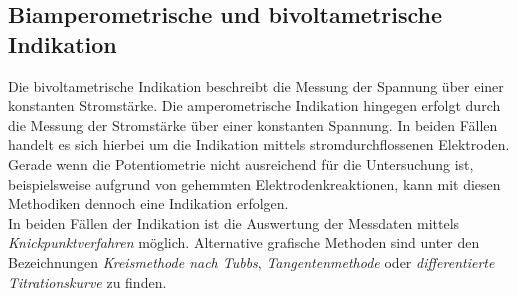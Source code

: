 \subsection*{Biamperometrische und bivoltametrische Indikation}
Die bivoltametrische Indikation beschreibt die Messung der Spannung über einer konstanten Stromstärke. Die amperometrische Indikation hingegen erfolgt durch die Messung der Stromstärke über einer konstanten Spannung. In beiden Fällen handelt es sich hierbei um die Indikation mittels stromdurchflossenen Elektroden. Gerade wenn die Potentiometrie nicht ausreichend für die Untersuchung ist, beispielsweise aufgrund von gehemmten Elektrodenkreaktionen, kann mit diesen Methodiken dennoch eine Indikation erfolgen.\\
In beiden Fällen der Indikation ist die Auswertung der Messdaten mittels \textit{Knickpunktverfahren} möglich. Alternative grafische Methoden sind unter den Bezeichnungen \textit{Kreismethode nach Tubbs}, \textit{Tangentenmethode} oder \textit{differentierte Titrationskurve} zu finden.

